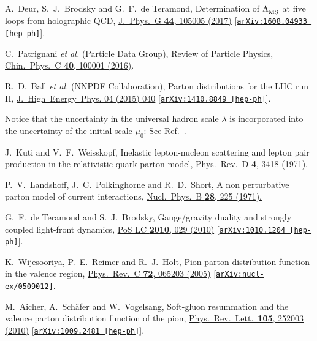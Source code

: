 \documentclass[aps,prl,reprint,groupedaddress, preprintnumbers]{revtex4-1}
\begin{document}
\begin{thebibliography}{50}
  A.~Deur, S.~J.~Brodsky and G.~F.~de Teramond,
  Determination of $\Lambda_{\overline{\rm MS}}$ at five loops from holographic QCD,
  \href{https://doi.org/10.1088/1361-6471/aa888a}{J.\ Phys.\ G {\bf 44}, 105005 (2017)}
  [\href{https://arxiv.org/abs/1608.04933}{\tt arXiv:1608.04933 [hep-ph]}].
  
  
  C.~Patrignani {\it et al.} (Particle Data Group),
  Review of Particle Physics,
  \href{https://doi.org/10.1088/1674-1137/40/10/100001}{Chin.\ Phys.\ C {\bf 40}, 100001 (2016)}.
 

  R.~D.~Ball {\it et al.} (NNPDF Collaboration),
  Parton distributions for the LHC run II,
  \href{https://doi.org/10.1007/JHEP04(2015)040}{J.\ High\ Energy\ Phys. 04 (2015) 040}
  [\href{https://arxiv.org/abs/1410.8849v4}{\tt arXiv:1410.8849 [hep-ph]}].
  
 
 Notice that the uncertainty in the universal hadron scale $\lambda$ is incorporated into the uncertainty of the initial scale $\mu_0$: See Ref.~\cite{Deur:2016opc}.
  

J.~Kuti and V.~F.~Weisskopf,
  Inelastic lepton-nucleon scattering and lepton pair production in the relativistic quark-parton model,
  \href{https://doi.org/10.1103/PhysRevD.4.3418}{Phys.\ Rev.\ D {\bf 4}, 3418 (1971)}.  
  
  
  P.~V.~Landshoff, J.~C.~Polkinghorne and R.~D.~Short,
  A non perturbative parton model of current interactions,
  \href{https://www.sciencedirect.com/science/article/pii/0550321371903750?via%3Dihub}{Nucl.\ Phys.\ B {\bf 28}, 225 (1971).}
  
  
  G.~F.~de Teramond and S.~J.~Brodsky,
  Gauge/gravity duality and strongly coupled light-front dynamics,
  \href{https://pos.sissa.it/119/029/}{PoS LC {\bf 2010}, 029 (2010)}
  [\href{https://arxiv.org/abs/1010.1204}{\tt arXiv:1010.1204 [hep-ph]}].    
  
  
  K.~Wijesooriya, P.~E.~Reimer and R.~J.~Holt,
  Pion parton distribution function in the valence region,
  \href{https://doi.org/10.1103/PhysRevC.72.065203}{Phys.\ Rev.\ C {\bf 72}, 065203 (2005)}
  [\href{https://arxiv.org/abs/nucl-ex/0509012}{\tt arXiv:nucl-ex/0509012]}.


  M.~Aicher, A.~Sch\"afer and W.~Vogelsang,
  Soft-gluon resummation and the valence parton distribution function of the pion,
  \href{https://doi.org/10.1103/PhysRevLett.105.252003}{Phys.\ Rev.\ Lett.\  {\bf 105}, 252003 (2010)}
  [\href{https://arxiv.org/abs/1009.2481}{\tt arXiv:1009.2481 [hep-ph]}].



\end{thebibliography}
\end{document}
